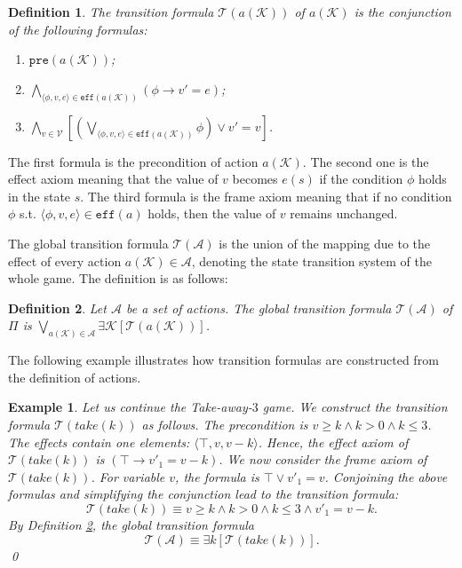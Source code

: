 \documentclass[review]{elsarticle}
\newcommand{\tuple}[1]{\langle {#1} \rangle}
\newcommand{\true}{\top}
\newcommand{\actparm}{\mathcal{K}}
\newcommand{\act}{\mathcal{A}}
\newcommand{\trans}{\mathcal{T}}
\newcommand{\pre}{\mathtt{pre}}
\newcommand{\eff}{\mathtt{eff}}
\newcommand{\con}{\phi}
\newcommand{\var}{\mathcal{V}}
\newtheorem{definition}{Definition}
\newtheorem{example}{Example}
\begin{document}
    \begin{definition}\label{def:transForm} \rm	
    	The transition formula $\trans(a(\actparm))$ of $a(\actparm)$ is the conjunction of the following formulas: 
    	\begin{enumerate}
    		\item $\pre(a(\actparm))$;
    		\item $\bigwedge_{\tuple{\con, v, e} \in \eff(a(\actparm))} (\con \rightarrow v' = e)$;
    		\item $\bigwedge_{v \in \var} [(\bigvee_{\tuple{\con, v, e} \in \eff(a(\actparm))} \con) \lor v' = v]$.
    	\end{enumerate}
    \end{definition}
    
    The first formula is the precondition of action $a(\actparm)$.
    The second one is the effect axiom meaning that the value of $v$ becomes $e(s)$ if the condition $\con$ holds in the state $s$.
    The third formula is the frame axiom meaning that if no condition $\con$ s.t. $\tuple{\con, v, e} \in \eff(a)$ holds, then the value of $v$ remains unchanged. 
    
    The global transition formula $\trans(\act)$ is the union of the mapping due to the effect of every action $a(\actparm) \in \act$, denoting the state transition system of the whole game.
    The definition is as follows:
    
    \begin{definition}\label{def:globalTransForm} \rm
    	Let $\act$ be a set of actions.
    	The global transition formula $\trans(\act)$ of $\Pi$ is $\bigvee_{a(\actparm) \in \act} \exists \actparm [\trans(a(\actparm))]$.
    \end{definition}
    
    The following example illustrates how transition formulas are constructed from the definition of actions.
    \begin{example}\label{exm:transForm} \rm
    	Let us continue the Take-away-$3$ game.
    	We construct the transition formula $\trans(take(k))$ as follows.
    	The precondition is $v \geq k \land k > 0 \land k \leq 3$.
    	The effects contain one elements: $\tuple{\true, v, v - k}$.
    	Hence, the effect axiom of $\trans(take(k))$ is $(\true \rightarrow v'_1 = v - k)$.
    	We now consider the frame axiom of $\trans(take(k))$.
    	For variable $v$, the formula is $\true \lor v'_1 = v $.
    	Conjoining the above formulas and simplifying the conjunction lead to the transition formula: 
    	\[\trans(take(k)) \equiv v \geq k \land k > 0 \land k \leq 3 \land v'_1 = v - k.\]
    	By Definition \ref{def:globalTransForm}, the global transition formula
    	\[\trans(\act) \equiv \exists k [\trans(take(k))].\]  	\qed
    \end{example}
    
\end{document}

